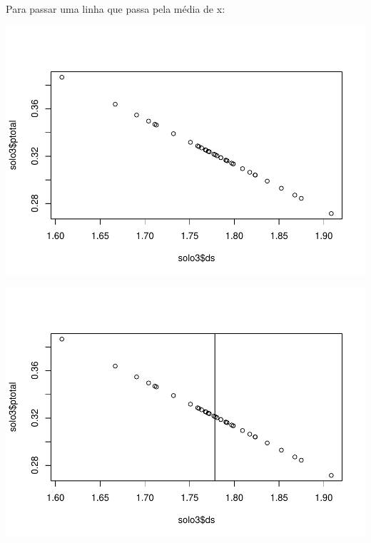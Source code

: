 \documentclass[
]{book}
\newenvironment{Shaded}{\begin{snugshade}}{\end{snugshade}}
\newcommand{\CommentTok}[1]{\textcolor[rgb]{0.56,0.35,0.01}{\textit{#1}}}
\newcommand{\DataTypeTok}[1]{\textcolor[rgb]{0.13,0.29,0.53}{#1}}
\newcommand{\KeywordTok}[1]{\textcolor[rgb]{0.13,0.29,0.53}{\textbf{#1}}}
\newcommand{\NormalTok}[1]{#1}
\newcommand{\OperatorTok}[1]{\textcolor[rgb]{0.81,0.36,0.00}{\textbf{#1}}}
\begin{document}
Para passar uma linha que passa pela média de x:

\begin{Shaded}
\end{Shaded}

\includegraphics{TudodoR_files/figure-latex/unnamed-chunk-161-1.pdf}

\begin{Shaded}
\end{Shaded}

\includegraphics{TudodoR_files/figure-latex/unnamed-chunk-162-1.pdf}
\end{document}
